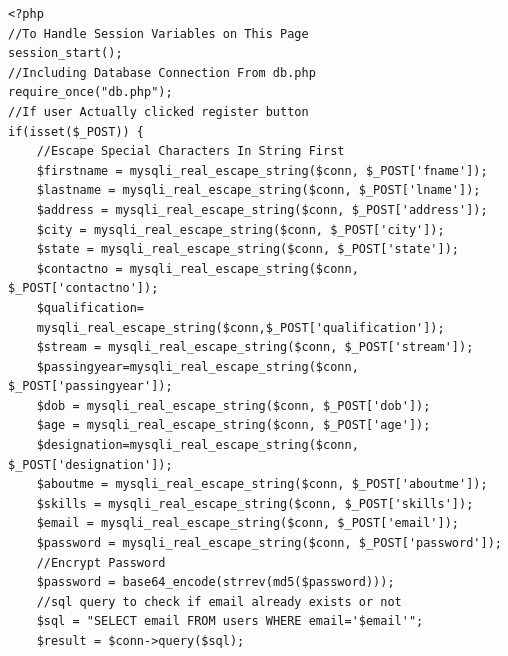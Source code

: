 \documentclass[a4paper,12pt]{report}
\begin{document}
\begin{verbatim}
<?php
//To Handle Session Variables on This Page
session_start();
//Including Database Connection From db.php
require_once("db.php");
//If user Actually clicked register button
if(isset($_POST)) {
	//Escape Special Characters In String First
	$firstname = mysqli_real_escape_string($conn, $_POST['fname']);
	$lastname = mysqli_real_escape_string($conn, $_POST['lname']);
	$address = mysqli_real_escape_string($conn, $_POST['address']);
	$city = mysqli_real_escape_string($conn, $_POST['city']);
	$state = mysqli_real_escape_string($conn, $_POST['state']);
	$contactno = mysqli_real_escape_string($conn, $_POST['contactno']);
	$qualification=
	mysqli_real_escape_string($conn,$_POST['qualification']);
	$stream = mysqli_real_escape_string($conn, $_POST['stream']);
	$passingyear=mysqli_real_escape_string($conn, $_POST['passingyear']);
	$dob = mysqli_real_escape_string($conn, $_POST['dob']);
	$age = mysqli_real_escape_string($conn, $_POST['age']);
	$designation=mysqli_real_escape_string($conn, $_POST['designation']);
	$aboutme = mysqli_real_escape_string($conn, $_POST['aboutme']);
	$skills = mysqli_real_escape_string($conn, $_POST['skills']);
	$email = mysqli_real_escape_string($conn, $_POST['email']);
	$password = mysqli_real_escape_string($conn, $_POST['password']);
	//Encrypt Password
	$password = base64_encode(strrev(md5($password)));
	//sql query to check if email already exists or not
	$sql = "SELECT email FROM users WHERE email='$email'";
	$result = $conn->query($sql);
	

\end{verbatim}
\end{document}
